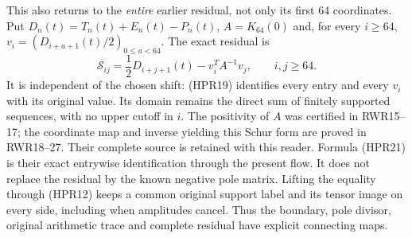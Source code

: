 This also returns to the \emph{entire} earlier residual, not only
its first 64 coordinates. Put $D_n(t)=T_n(t)+E_n(t)-P_n(t)$,
$A=K_{64}(0)$ and, for every $i\ge64$,
$v_i=(D_{i+a+1}(t)/2)_{0\le a<64}$. The exact residual is
\begin{equation}\tag{HPR21}
 \mathscr S_{ij}=\frac12 D_{i+j+1}(t)-v_i^T A^{-1}v_j,
 \qquad i,j\ge64.
\end{equation}
It is independent of the chosen shift: (HPR19) identifies every entry
and every $v_i$ with its original value. Its domain remains the direct
sum of finitely supported sequences, with no upper cutoff in $i$.
The positivity of $A$ was certified in RWR15--17; the coordinate map
and inverse yielding this Schur form are proved in RWR18--27.
Their complete source is retained with this reader. Formula (HPR21)
is their exact entrywise identification through the present flow.
It does not replace the residual by the known negative pole matrix.
Lifting the equality through (HPR12) keeps a common original support
label and its tensor image on every side, including when amplitudes
cancel. Thus the boundary, pole divisor, original arithmetic trace
and complete residual have explicit connecting maps.
